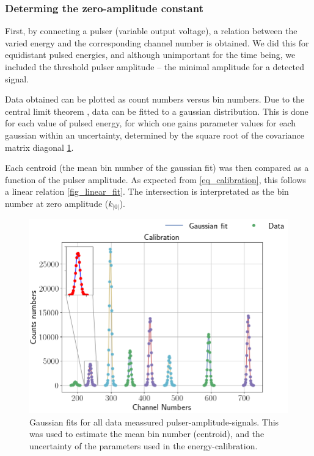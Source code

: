 \subsubsection{Determing the zero-amplitude constant}
First, by connecting a pulser (variable output voltage), a relation between the
varied energy and the corresponding channel number is obtained. 
We did this for equidistant pulsed energies, and although unimportant for the
time being, we included the threshold pulser amplitude -- the minimal amplitude
for a detected signal.

Data obtained can be plotted as count numbers versus bin numbers. Due to the
central limit theorem \parencite[p. 49]{statistics}, data can be fitted to a
gaussian distribution. This is done for each value of pulsed energy, for which
one gains parameter values for each gaussian within an uncertainty, determined
by the square root of the covariance matrix diagonal \cref{fig_gaussian_fit}.

Each centroid (the mean bin number of the gaussian fit) was then compared as a
function of the pulser amplitude. As expected from \cref{eq_calibration}, this
follows a linear relation \cref{fig_linear_fit}.
The intersection is interpretated as the bin number at zero amplitude ($k_|0|$).

\begin{figure}[t]
\centering
\includegraphics[width=0.99\columnwidth]{gaussian_fit}
\caption{Gaussian fits for all data meassured pulser-amplitude-signals. This was used to estimate the mean
bin number (centroid), and the uncertainty of the parameters used in the
energy-calibration.}
\label{fig_gaussian_fit}
\end{figure}


